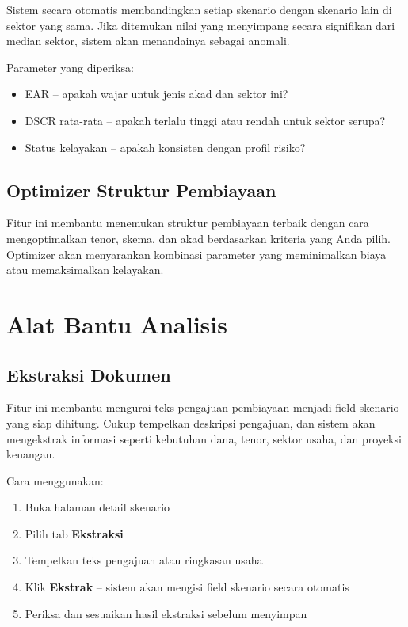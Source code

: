 \documentclass[12pt,a4paper,twoside]{report}
\begin{document}
Sistem secara otomatis membandingkan setiap skenario dengan skenario lain di sektor yang sama. Jika ditemukan nilai yang menyimpang secara signifikan dari median sektor, sistem akan menandainya sebagai anomali.

Parameter yang diperiksa:
\begin{itemize}
  \item EAR -- apakah wajar untuk jenis akad dan sektor ini?
  \item DSCR rata-rata -- apakah terlalu tinggi atau rendah untuk sektor serupa?
  \item Status kelayakan -- apakah konsisten dengan profil risiko?
\end{itemize}

\section{Optimizer Struktur Pembiayaan}

Fitur ini membantu menemukan struktur pembiayaan terbaik dengan cara mengoptimalkan tenor, skema, dan akad berdasarkan kriteria yang Anda pilih. Optimizer akan menyarankan kombinasi parameter yang meminimalkan biaya atau memaksimalkan kelayakan.

\chapter{Alat Bantu Analisis}

\section{Ekstraksi Dokumen}

Fitur ini membantu mengurai teks pengajuan pembiayaan menjadi field skenario yang siap dihitung. Cukup tempelkan deskripsi pengajuan, dan sistem akan mengekstrak informasi seperti kebutuhan dana, tenor, sektor usaha, dan proyeksi keuangan.

Cara menggunakan:
\begin{enumerate}
  \item Buka halaman detail skenario
  \item Pilih tab \textbf{Ekstraksi}
  \item Tempelkan teks pengajuan atau ringkasan usaha
  \item Klik \textbf{Ekstrak} -- sistem akan mengisi field skenario secara otomatis
  \item Periksa dan sesuaikan hasil ekstraksi sebelum menyimpan
\end{enumerate}
\end{document}
